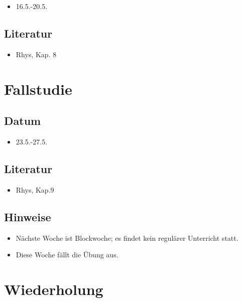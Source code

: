 \documentclass[
]{book}
\providecommand{\tightlist}{%
  \setlength{\itemsep}{0pt}\setlength{\parskip}{0pt}}
\begin{document}
\begin{itemize}
\tightlist
\item
  16.5.-20.5.
\end{itemize}

\hypertarget{literatur-9}{%
\subsection{Literatur}\label{literatur-9}}

\begin{itemize}
\tightlist
\item
  Rhys, Kap. 8
\end{itemize}

\hypertarget{fallstudie}{%
\section{Fallstudie}\label{fallstudie}}

\hypertarget{datum-10}{%
\subsection{Datum}\label{datum-10}}

\begin{itemize}
\tightlist
\item
  23.5.-27.5.
\end{itemize}

\hypertarget{literatur-10}{%
\subsection{Literatur}\label{literatur-10}}

\begin{itemize}
\tightlist
\item
  Rhys, Kap.9
\end{itemize}

\hypertarget{hinweise-3}{%
\subsection{Hinweise}\label{hinweise-3}}

\begin{itemize}
\tightlist
\item
  Nächste Woche ist Blockwoche; es findet kein regulärer Unterricht statt.
\item
  Diese Woche fällt die Übung aus.
\end{itemize}

\hypertarget{wiederholung-1}{%
\section{Wiederholung}\label{wiederholung-1}}
\end{document}
